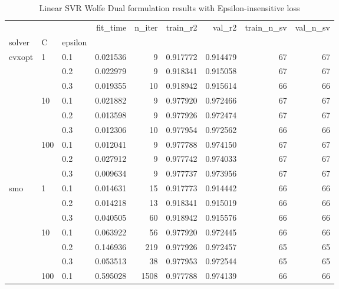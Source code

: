 \begin{table}[h!]
\centering
\caption{Linear SVR Wolfe Dual formulation results with Epsilon-insensitive loss}
\label{linear_dual_svr_cv_results}
\begin{tabular}{lllrrrrrr}
\toprule
       &     &     &  fit\_time &  n\_iter &  train\_r2 &    val\_r2 &  train\_n\_sv &  val\_n\_sv \\
solver & C & epsilon &           &         &           &           &             &           \\
\midrule
cvxopt & 1   & 0.1 &  0.021536 &       9 &  0.917772 &  0.914479 &          67 &        67 \\
       &     & 0.2 &  0.022979 &       9 &  0.918341 &  0.915058 &          67 &        67 \\
       &     & 0.3 &  0.019355 &      10 &  0.918942 &  0.915614 &          66 &        66 \\
       & 10  & 0.1 &  0.021882 &       9 &  0.977920 &  0.972466 &          67 &        67 \\
       &     & 0.2 &  0.013598 &       9 &  0.977926 &  0.972474 &          67 &        67 \\
       &     & 0.3 &  0.012306 &      10 &  0.977954 &  0.972562 &          66 &        66 \\
       & 100 & 0.1 &  0.012041 &       9 &  0.977788 &  0.974150 &          67 &        67 \\
       &     & 0.2 &  0.027912 &       9 &  0.977742 &  0.974033 &          67 &        67 \\
       &     & 0.3 &  0.009634 &       9 &  0.977737 &  0.973956 &          67 &        67 \\
smo & 1   & 0.1 &  0.014631 &      15 &  0.917773 &  0.914442 &          66 &        66 \\
       &     & 0.2 &  0.014218 &      13 &  0.918341 &  0.915019 &          66 &        66 \\
       &     & 0.3 &  0.040505 &      60 &  0.918942 &  0.915576 &          66 &        66 \\
       & 10  & 0.1 &  0.063922 &      56 &  0.977920 &  0.972445 &          66 &        66 \\
       &     & 0.2 &  0.146936 &     219 &  0.977926 &  0.972457 &          65 &        65 \\
       &     & 0.3 &  0.053513 &      38 &  0.977953 &  0.972544 &          65 &        65 \\
       & 100 & 0.1 &  0.595028 &    1508 &  0.977788 &  0.974139 &          66 &        66 \\

\end{tabular}
\end{table}
